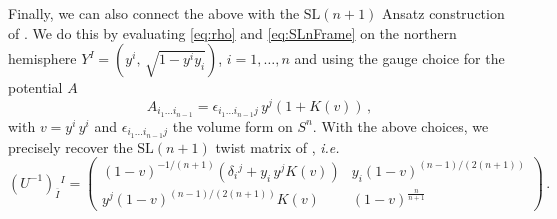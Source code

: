 \documentclass[a4paper, 11pt]{article}
\numberwithin{equation}{section}
\newcommand{\ov}[1]{\overline{#1}}
\newcommand{\SL}[1]{\mathrm{SL}( #1 )}
\newcommand{\+}{\oplus}
\newcommand{\UI}{\left(U^{-1}\right)}
\newcommand{\fl}[1]{\ov{#1}}
\begin{document}
Finally, we can also connect the above with the $\SL{n+1}$ Ansatz construction of \cite{Hohm:2014qga}. We do this by evaluating \eqref{eq:rho} and \eqref{eq:SLnFrame} on the northern hemisphere $Y^I = \left( y^i,\, \sqrt{1-y^i y_i}\right)$, $i = 1, \ldots, n$ and using the gauge choice for the potential $A$
\begin{equation}
	A_{i_1 \ldots i_{n-1}} = \epsilon_{i_1 \ldots i_{n-1}j}\, y^j (1 + K(v)) \,,
\end{equation}
with $v = y^i\, y^i$ and $\epsilon_{i_1 \ldots i_{n-1}j}$ the volume form on $S^n$. With the above choices, we precisely recover the $\SL{n+1}$ twist matrix of \cite{Hohm:2014qga}, \textit{i.e.}
\begin{equation} \label{eq:SLnTwist}
	\UI_{\fl{I}}{}^I = \begin{pmatrix}
		\left(1-v\right)^{-1/(n+1)} \left( \delta_i{}^j + y_i\, y^j K(v) \right) & y_i \left(1-v\right)^{(n-1)/(2(n+1))} \\
		y^j \left(1-v\right)^{(n-1)/(2(n+1))} K(v) & \left(1-v\right)^{\tfrac{n}{n+1}}
	\end{pmatrix} \,.
\end{equation}
\end{document}
